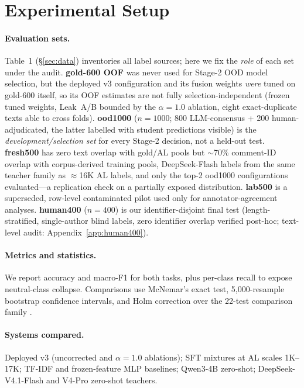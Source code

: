 \section{Experimental Setup}
\label{sec:setup}

\paragraph{Evaluation sets.} Table~1 (\S\ref{sec:data}) inventories all
label sources; here we fix the \emph{role} of each set under the audit.
\textbf{gold-600 OOF} was never used for Stage-2 OOD model selection,
but the deployed v3 configuration and its fusion weights \emph{were}
tuned on gold-600 itself, so its OOF estimates are not fully
selection-independent (frozen tuned weights, Leak~A/B bounded by the
$\alpha{=}1.0$ ablation, eight exact-duplicate texts able to cross
folds). \textbf{ood1000} ($n{=}1000$; 800 LLM-consensus + 200
human-adjudicated, the latter labelled with student predictions
visible) is the \emph{development/selection set} for every Stage-2
decision, not a held-out test. \textbf{fresh500} has zero text overlap
with gold/AL pools but $\sim$70\% comment-ID overlap with
corpus-derived training pools, DeepSeek-Flash labels from the same
teacher family as $\approx$16K AL labels, and only the top-2 ood1000
configurations evaluated---a replication check on a partially exposed
distribution. \textbf{lab500} is a superseded, row-level contaminated
pilot used only for annotator-agreement analyses. \textbf{human400}
($n{=}400$) is our identifier-disjoint final test (length-stratified,
single-author blind labels, zero identifier overlap verified post-hoc;
text-level audit: Appendix~\ref{app:human400}).

\paragraph{Metrics and statistics.} We report accuracy and macro-F1 for
both tasks, plus per-class recall to expose neutral-class collapse.
Comparisons use McNemar's exact test, 5{,}000-resample bootstrap confidence
intervals, and Holm correction over the 22-test comparison family
\citep{dror2018hitchhiker}.

\paragraph{Systems compared.} Deployed v3 (uncorrected and $\alpha{=}1.0$
ablations); SFT mixtures at AL scales 1K--17K; TF-IDF and frozen-feature MLP
baselines; Qwen3-4B zero-shot; DeepSeek-V4.1-Flash and V4-Pro zero-shot
teachers.

